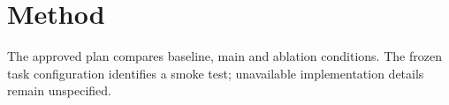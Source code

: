 \section{Method}
The approved plan compares baseline, main and ablation conditions. The frozen task configuration identifies a smoke test; unavailable implementation details remain unspecified.

